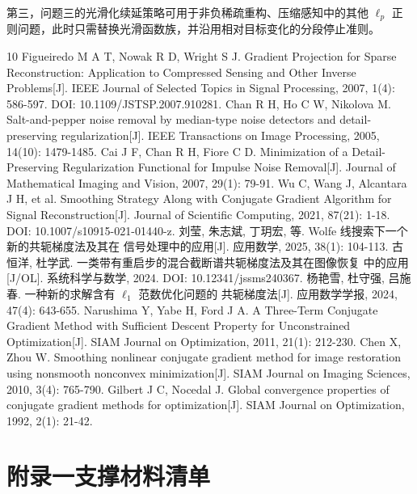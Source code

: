 \documentclass[withoutpreface,bwprint]{cumcmthesis}
\begin{document}
第三，问题三的光滑化续延策略可用于非负稀疏重构、压缩感知中的其他 $\ell_p$
正则问题，此时只需替换光滑函数族，并沿用相对目标变化的分段停止准则。


\begin{thebibliography}{10}
  Figueiredo M A T, Nowak R D, Wright S J. Gradient Projection for Sparse
  Reconstruction: Application to Compressed Sensing and Other Inverse
  Problems[J]. IEEE Journal of Selected Topics in Signal Processing,
  2007, 1(4): 586-597. DOI: 10.1109/JSTSP.2007.910281.
  Chan R H, Ho C W, Nikolova M. Salt-and-pepper noise removal by
  median-type noise detectors and detail-preserving regularization[J].
  IEEE Transactions on Image Processing, 2005, 14(10): 1479-1485.
  Cai J F, Chan R H, Fiore C D. Minimization of a Detail-Preserving
  Regularization Functional for Impulse Noise Removal[J]. Journal of
  Mathematical Imaging and Vision, 2007, 29(1): 79-91.
  Wu C, Wang J, Alcantara J H, et al. Smoothing Strategy Along with
  Conjugate Gradient Algorithm for Signal Reconstruction[J]. Journal of
  Scientific Computing, 2021, 87(21): 1-18. DOI: 10.1007/s10915-021-01440-z.
  刘莹, 朱志斌, 丁玥宏, 等. Wolfe 线搜索下一个新的共轭梯度法及其在
  信号处理中的应用[J]. 应用数学, 2025, 38(1): 104-113.
  古恒洋, 杜学武. 一类带有重启步的混合截断谱共轭梯度法及其在图像恢复
  中的应用[J/OL]. 系统科学与数学, 2024. DOI: 10.12341/jssms240367.
  杨艳雪, 杜守强, 吕施春. 一种新的求解含有 $\ell_1$ 范数优化问题的
  共轭梯度法[J]. 应用数学学报, 2024, 47(4): 643-655.
  Narushima Y, Yabe H, Ford J A. A Three-Term Conjugate Gradient Method
  with Sufficient Descent Property for Unconstrained Optimization[J].
  SIAM Journal on Optimization, 2011, 21(1): 212-230.
  Chen X, Zhou W. Smoothing nonlinear conjugate gradient method for image
  restoration using nonsmooth nonconvex minimization[J]. SIAM Journal on
  Imaging Sciences, 2010, 3(4): 765-790.
  Gilbert J C, Nocedal J. Global convergence properties of conjugate
  gradient methods for optimization[J]. SIAM Journal on Optimization,
  1992, 2(1): 21-42.
\end{thebibliography}

\newpage
\section*{附录一\quad 支撑材料清单}
\end{document}

